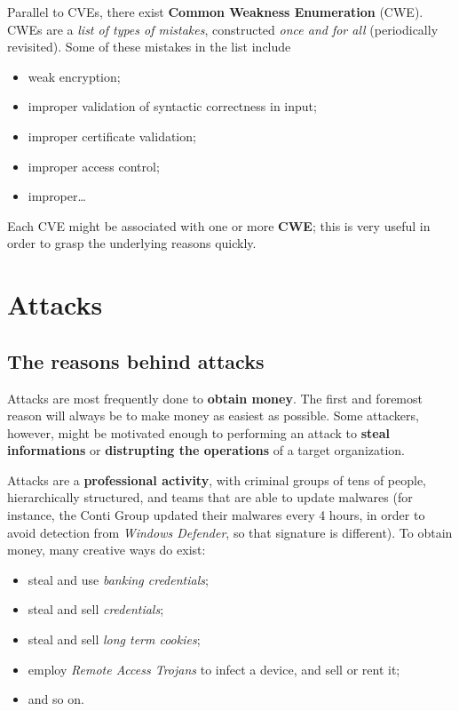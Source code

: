 \documentclass[10pt]{extreport}
\begin{document}
Parallel to CVEs, there exist \textbf{Common Weakness Enumeration} (CWE). CWEs
are a \emph{list of types of mistakes}, constructed \emph{once and for all}
(periodically revisited). Some of these mistakes in the list include
\begin{itemize}
    \item weak encryption;
    \item improper validation of syntactic correctness in input;
    \item improper certificate validation;
    \item improper access control;
    \item improper\dots
\end{itemize}

Each CVE might be associated with one or more \textbf{CWE}; this is very useful
in order to grasp the underlying reasons quickly.





\chapter{Attacks}

\section{The reasons behind attacks}

Attacks are most frequently done to \textbf{obtain money}. The first and
foremost reason will always be to make money as easiest as possible. Some
attackers, however, might be motivated enough to performing an attack to
\textbf{steal informations} or \textbf{distrupting the operations} of a
target organization.

Attacks are a \textbf{professional activity}, with criminal groups of tens of
people, hierarchically structured, and teams that are able to update malwares
(for instance, the Conti Group updated their malwares every 4 hours, in order
to avoid detection from \emph{Windows Defender}, so that signature is
different). To obtain money, many creative ways do exist:
\begin{itemize}
    \item steal and use \emph{banking credentials};
    \item steal and sell \emph{credentials};
    \item steal and sell \emph{long term cookies};
    \item employ \emph{Remote Access Trojans} to infect a device, and sell or
        rent it;
    \item and so on.
\end{itemize}
\end{document}
